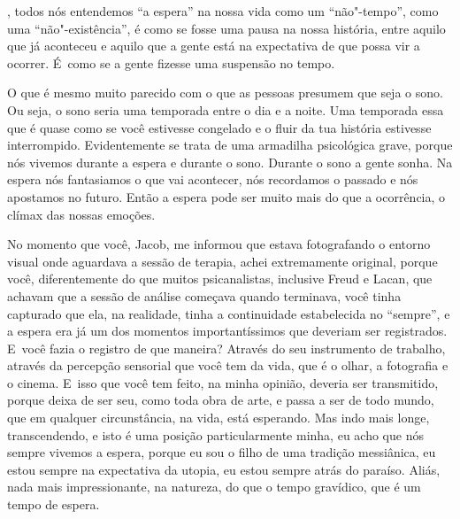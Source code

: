  

 

, todos nós entendemos ``a espera'' na nossa vida como um
``não"-tempo'', como uma ``não"-existência'', é como se fosse uma pausa na
nossa história, entre aquilo que já aconteceu e aquilo que a gente está
na expectativa de que possa vir a ocorrer. É~como se a gente fizesse uma
suspensão no tempo.

O que é mesmo muito parecido com o que as pessoas presumem que seja o
sono. Ou seja, o sono seria uma temporada entre o dia e a noite. Uma
temporada essa que é quase como se você estivesse congelado e o fluir da
tua história estivesse interrompido. Evidentemente se trata de uma
armadilha psicológica grave, porque nós vivemos durante a espera e
durante o sono. Durante o sono a gente sonha. Na espera nós fantasiamos
o que vai acontecer, nós recordamos o passado e nós apostamos no futuro.
Então a espera pode ser muito mais do que a ocorrência, o clímax das
nossas emoções.

No momento que você, Jacob, me informou que estava fotografando o entorno visual
onde aguardava a sessão de terapia, achei
extremamente original, porque você, diferentemente do que muitos
psicanalistas, inclusive Freud e Lacan, que achavam que a sessão de
análise começava quando terminava, você tinha capturado que ela, na
realidade, tinha a continuidade estabelecida no ``sempre'', e a espera
era já um dos momentos importantíssimos que deveriam ser registrados. E~você fazia o registro de que maneira? Através do seu instrumento de
trabalho, através da percepção sensorial que você tem da vida, que é o
olhar, a fotografia e o cinema. E~isso que você tem feito, na minha
opinião, deveria ser transmitido, porque deixa de ser seu, como toda
obra de arte, e passa a ser de todo mundo, que em qualquer
circunstância, na vida, está esperando. Mas indo mais longe,
transcendendo, e isto é uma posição particularmente minha, eu acho que
nós sempre vivemos a espera, porque eu sou o filho de uma tradição
messiânica, eu estou sempre na expectativa da utopia, eu estou sempre
atrás do paraíso. Aliás, nada mais impressionante, na natureza, do que o
tempo gravídico, que é um tempo de espera.

\begin{flushright}~\end{flushright}

